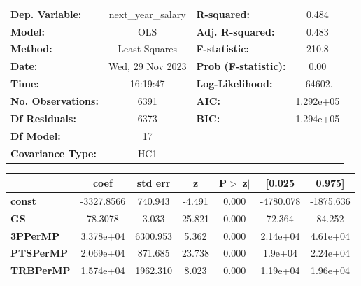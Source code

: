 \begin{center}
\begin{tabular}{lclc}
\toprule
\textbf{Dep. Variable:}             & next\_year\_salary & \textbf{  R-squared:         } &     0.484   \\
\textbf{Model:}                     &        OLS         & \textbf{  Adj. R-squared:    } &     0.483   \\
\textbf{Method:}                    &   Least Squares    & \textbf{  F-statistic:       } &     210.8   \\
\textbf{Date:}                      &  Wed, 29 Nov 2023  & \textbf{  Prob (F-statistic):} &     0.00    \\
\textbf{Time:}                      &      16:19:47      & \textbf{  Log-Likelihood:    } &   -64602.   \\
\textbf{No. Observations:}          &         6391       & \textbf{  AIC:               } & 1.292e+05   \\
\textbf{Df Residuals:}              &         6373       & \textbf{  BIC:               } & 1.294e+05   \\
\textbf{Df Model:}                  &           17       & \textbf{                     } &             \\
\textbf{Covariance Type:}           &        HC1         & \textbf{                     } &             \\
\bottomrule
\end{tabular}
\begin{tabular}{lcccccc}
                                    & \textbf{coef} & \textbf{std err} & \textbf{z} & \textbf{P$> |$z$|$} & \textbf{[0.025} & \textbf{0.975]}  \\
\midrule
\textbf{const}                      &   -3327.8566  &      740.943     &    -4.491  &         0.000        &    -4780.078    &    -1875.636     \\
\textbf{GS}                         &      78.3078  &        3.033     &    25.821  &         0.000        &       72.364    &       84.252     \\
\textbf{3PPerMP}                    &    3.378e+04  &     6300.953     &     5.362  &         0.000        &     2.14e+04    &     4.61e+04     \\
\textbf{PTSPerMP}                   &    2.069e+04  &      871.685     &    23.738  &         0.000        &      1.9e+04    &     2.24e+04     \\
\textbf{TRBPerMP}                   &    1.574e+04  &     1962.310     &     8.023  &         0.000        &     1.19e+04    &     1.96e+04     \\

\end{tabular}
\end{center}
